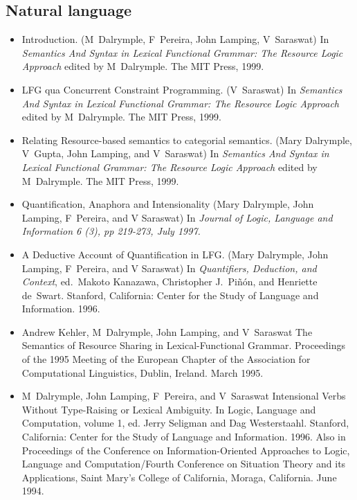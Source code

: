 \documentclass{article}
\begin{document}
\subsection*{Natural language}
\begin{itemize}

\item Introduction. (M~Dalrymple, F~Pereira, John Lamping,
   V~Saraswat) In \textit{Semantics And Syntax in Lexical Functional
   Grammar: The Resource Logic Approach} edited by M~Dalrymple. The
   MIT Press, 1999.

\item LFG qua Concurrent Constraint Programming. (V~Saraswat) In
   \textit{ Semantics And Syntax in Lexical Functional Grammar: The Resource
    Logic Approach} edited by M~Dalrymple. The MIT Press, 1999.

\item Relating Resource-based semantics to categorial semantics. (Mary
    Dalrymple, V~Gupta, John Lamping, and V~Saraswat) In
   \textit{ Semantics And Syntax in Lexical Functional Grammar: The Resource
    Logic Approach} edited by M~Dalrymple. The MIT Press, 1999.

\item    Quantification, Anaphora and Intensionality (Mary
    Dalrymple, John Lamping, F~Pereira, and V
    Saraswat) In \textit{ Journal of Logic, Language and Information 6
      (3), pp 219-273, July 1997.}

\item    A Deductive Account of Quantification in LFG.  (Mary
    Dalrymple, John Lamping, F~Pereira, and V
    Saraswat) In \textit{ Quantifiers, Deduction, and Context}, ed.\
    Makoto Kanazawa, Christopher J.~Pi\~{n}\'{o}n, and Henriette
    de~Swart.  Stanford, California: Center for the Study of
    Language and Information.  1996. 

\item    Andrew Kehler, M~Dalrymple, John Lamping, and V~Saraswat
    The Semantics of Resource Sharing in Lexical-Functional Grammar.  
    Proceedings of the 1995 Meeting of the
    European Chapter of the Association for Computational
    Linguistics, Dublin, Ireland. March 1995.

\item    M~Dalrymple, John Lamping, F~Pereira, and V~Saraswat
    Intensional Verbs Without Type-Raising or Lexical Ambiguity.
    In Logic, Language and Computation, volume 1, ed. Jerry
    Seligman and Dag Westerstaahl. Stanford, California:
    Center for the Study of Language and Information.  1996.
    Also in Proceedings of the Conference on
    Information-Oriented Approaches to Logic, Language and
    Computation/Fourth Conference on Situation Theory and its 
    Applications, Saint Mary's College of California, Moraga,
    California. June 1994.


\end{itemize}
\end{document}
